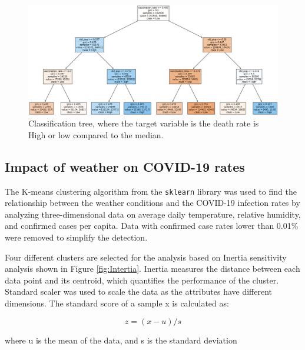 \documentclass[sigconf,screen,nonacm]{acmart}
\begin{document}
\begin{figure}[h]
  \centering
  \includegraphics[width=\linewidth]{Figures/tree_high_res.png}
  \caption{Classification tree, where the target variable is the death rate is High or low compared to the median.}
  \label{fig:decision-tree}
\end{figure}


\subsection{Impact of weather on COVID-19 rates} \label{weather-clustering}

The K-means clustering algorithm from the \texttt{sklearn} library was used to find the relationship between the weather conditions and the COVID-19 infection rates by analyzing three-dimensional data on average daily temperature, relative humidity, and confirmed cases per capita. Data with confirmed case rates lower than 0.01\% were removed to simplify the detection. 



Four different clusters are selected for the analysis based on Inertia sensitivity analysis shown in Figure \ref{fig:Intertia}. Inertia measures the distance between each data point and its centroid, which quantifies the performance of the cluster. Standard scaler was used to scale the data as the attributes have different dimensions. The standard score of a sample x is calculated as:

\begin{equation}
z = (x - u) / s
\end{equation}

\noindent where u is the mean of the data, and s is the standard deviation
\end{document}
